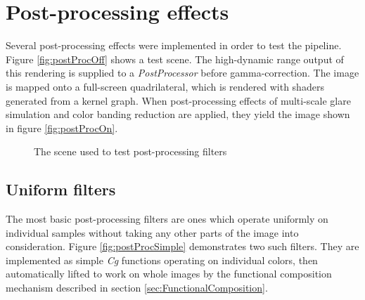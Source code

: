 \clearpage
\section{Post-processing effects}

Several post-processing effects were implemented in order to test the pipeline. Figure \ref{fig:postProcOff} shows a test scene. The high-dynamic range output of this rendering is supplied to a \emph{PostProcessor} before gamma-correction. The image is mapped onto a full-screen quadrilateral, which is rendered with shaders generated from a kernel graph. When post-processing effects of multi-scale glare simulation and color banding reduction are applied, they yield the image shown in figure \ref{fig:postProcOn}.

\begin{figure}[h!]
  \centering
  \caption{The scene used to test post-processing filters}
  \label{fig:postProcTestScene}
\end{figure}

\subsection{Uniform filters}

The most basic post-processing filters are ones which operate uniformly on individual samples without taking any other parts of the image into consideration. Figure \ref{fig:postProcSimple} demonstrates two such filters. They are implemented as simple \emph{Cg} functions operating on individual colors, then automatically lifted to work on whole images by the functional composition mechanism described in section \ref{sec:FunctionalComposition}.

